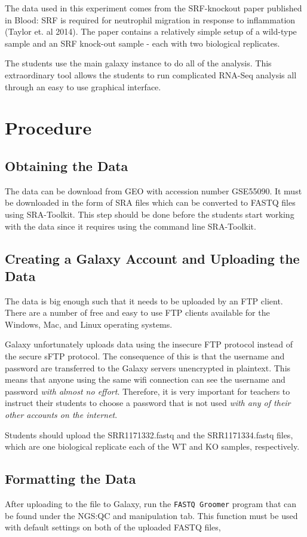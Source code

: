 \documentclass{report}
\begin{document}
The data used in this experiment comes from the SRF-knockout paper published in Blood: SRF is required for neutrophil migration in response to inflammation (Taylor et. al 2014). The paper contains a relatively simple setup of a wild-type sample and an SRF knock-out sample - each with two biological replicates.

The students use the main galaxy instance to do all of the analysis. This extraordinary tool allows the students to run complicated RNA-Seq analysis all through an easy to use graphical interface.

\section{Procedure}
\subsection{Obtaining the Data}
The data can be download from GEO with accession number GSE55090. It must be downloaded in the form of SRA files which can be converted to FASTQ files using SRA-Toolkit. This step should be done before the students start working with the data since it requires using the command line SRA-Toolkit.

\subsection{Creating a Galaxy Account and Uploading the Data}
The data is big enough such that it needs to be uploaded by an FTP client. There are a number of free and easy to use FTP clients available for the Windows, Mac, and Linux operating systems. 

Galaxy unfortunately uploads data using the insecure FTP protocol instead of the secure sFTP protocol. The consequence of this is that the username and password are transferred to the Galaxy servers unencrypted in plaintext. This means that anyone using the same wifi connection can see the username and password \emph{with almost no effort}. Therefore, it is very important for teachers to instruct their students to choose a password that is not used \emph{with any of their other accounts on the internet}. 

Students should upload the SRR1171332.fastq and the SRR1171334.fastq files, which are one biological replicate each of the WT and KO samples, respectively.

\subsection{Formatting the Data}
After uploading to the file to Galaxy, run the \texttt{FASTQ Groomer} program that can be found under the NGS:QC and manipulation tab. This function must be used with default settings on both of the uploaded FASTQ files,  
\end{document}
